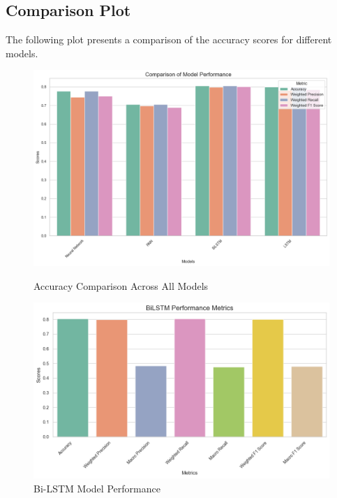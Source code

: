 \subsection{Comparison Plot}
The following plot presents a comparison of the accuracy scores for different models.
\begin{figure}[H]
	\centering
	\begin{minipage}{0.48\textwidth}
		\centering
		\includegraphics[width=\linewidth]{img/paper_2/Comparision Plot.png}
		\caption{Accuracy Comparison Across All Models}
		\label{fig:accuracy_comparison}
	\end{minipage}
	\hfill
	\begin{minipage}{0.48\textwidth}
		\centering
		\includegraphics[width=\linewidth]{img/paper_2/BILSTM.png}
		\caption{Bi-LSTM Model Performance}
		\label{fig:bilstm_performance}
	\end{minipage}
	
	\vspace{0.5cm}
	

\end{figure}
